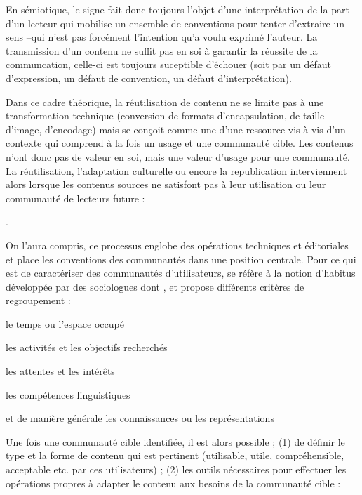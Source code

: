 En sémiotique, le signe fait donc toujours l'objet d'une interprétation de la part d'un lecteur qui mobilise un ensemble de conventions pour tenter d'extraire un sens --qui n'est pas forcément l'intention qu'a voulu exprimé l'auteur.
La transmission d'un contenu ne suffit pas en soi à garantir la réussite de la communcation, celle-ci est toujours suceptible d'échouer (soit par un défaut d'expression, un défaut de convention, un défaut d'interprétation). 

Dans ce cadre théorique, la réutilisation de contenu ne se limite pas à une transformation technique (conversion de formats d'encapsulation, de taille d'image, d'encodage) mais se conçoit comme une  \parencite{Stockinger2007} d'une ressource vis-à-vis d'un contexte qui comprend à la fois un usage et une communauté cible. 
Les contenus n'ont donc pas de valeur en soi, mais une valeur d'usage pour une communauté. 
La réutilisation, l'adaptation culturelle ou encore la republication interviennent alors lorsque les contenus sources ne satisfont pas à leur utilisation ou leur communauté de lecteurs future : 

 \parencite{Stockinger2007b}.


On l'aura compris, ce processus englobe des opérations techniques et éditoriales et place les conventions des communautés dans une position centrale. 
Pour ce qui est de caractériser des communautés d'utilisateurs,  se réfère à la notion d'habitus développée par des sociologues dont \cite{Bourdieu}, et propose différents critères de regroupement :
\begin{liste}
	\item le temps ou l'espace occupé
	\item les activités et les objectifs recherchés
	\item les attentes et les intérêts
	\item les compétences linguistiques
	\item et de manière générale les connaissances ou les représentations
\end{liste}

Une fois une communauté cible identifiée, il est alors possible ; (1) de définir le type et la forme de contenu qui est pertinent (utilisable, utile, compréhensible, acceptable etc. par ces utilisateurs) ; (2) les outils nécessaires pour effectuer les opérations propres à adapter le contenu aux besoins de la communauté cible :

